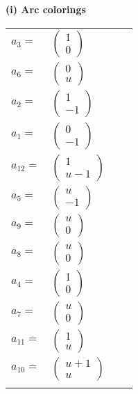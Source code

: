 \documentclass[1p]{elsarticle_modified}
\theoremstyle{definition}
\begin{document}
\flushleft \textbf{(i) Arc colorings}\\
\begin{tabular}{m{7pt} m{180pt} m{7pt} m{180pt} }
\flushright $a_{3}=$&$\begin{pmatrix}1\\0\end{pmatrix}$ \\
\flushright $a_{6}=$&$\begin{pmatrix}0\\u\end{pmatrix}$ \\
\flushright $a_{2}=$&$\begin{pmatrix}1\\-1\end{pmatrix}$ \\
\flushright $a_{1}=$&$\begin{pmatrix}0\\-1\end{pmatrix}$ \\
\flushright $a_{12}=$&$\begin{pmatrix}1\\u-1\end{pmatrix}$ \\
\flushright $a_{5}=$&$\begin{pmatrix}u\\-1\end{pmatrix}$ \\
\flushright $a_{9}=$&$\begin{pmatrix}u\\0\end{pmatrix}$ \\
\flushright $a_{8}=$&$\begin{pmatrix}u\\0\end{pmatrix}$ \\
\flushright $a_{4}=$&$\begin{pmatrix}1\\0\end{pmatrix}$ \\
\flushright $a_{7}=$&$\begin{pmatrix}u\\0\end{pmatrix}$ \\
\flushright $a_{11}=$&$\begin{pmatrix}1\\u\end{pmatrix}$ \\
\flushright $a_{10}=$&$\begin{pmatrix}u+1\\u\end{pmatrix}$\\&\end{tabular}
\end{document}

